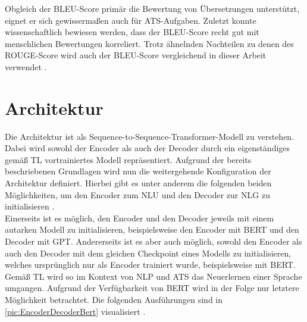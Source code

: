 \noindent
Obgleich der \ac{BLEU}-Score primär die Bewertung von Übersetzungen unterstützt, eignet er sich gewissermaßen auch für \ac{ATS}-Aufgaben. Zuletzt konnte wissenschaftlich bewiesen werden, dass der \ac{BLEU}-Score recht gut mit menschlichen Bewertungen korreliert. Trotz ähnelnden Nachteilen zu denen des \ac{ROUGE}-Score wird auch der \ac{BLEU}-Score vergleichend in dieser Arbeit verwendet \cite[S.~6-7]{PAP02}.


\section{Architektur}
\noindent
Die Architektur ist als Sequence-to-Sequence-Transformer-Modell zu verstehen. Dabei wird sowohl der Encoder als auch der Decoder durch ein eigenständiges gemäß \ac{TL} vortrainiertes Modell repräsentiert. Aufgrund der bereits beschriebenen Grundlagen wird nun die weitergehende Konfiguration der Architektur definiert. Hierbei gibt es unter anderem die folgenden beiden Möglichkeiten, um den Encoder zum \ac{NLU} und den Decoder zur \ac{NLG} zu initialisieren \cite[S.~2]{ROT20}.\\

\noindent
Einerseits ist es möglich, den Encoder und den Decoder jeweils mit einem autarken Modell zu initialisieren, beispielsweise den Encoder mit \ac{BERT} und den Decoder mit \ac{GPT}. Andererseits ist es aber auch möglich, sowohl den Encoder als auch den Decoder mit dem gleichen Checkpoint eines Modells zu initialisieren, welches ursprünglich nur als Encoder trainiert wurde, beispielsweise mit \ac{BERT}. Gemäß \ac{TL} wird so im Kontext von \ac{NLP} und \ac{ATS} das Neuerlernen einer Sprache umgangen. Aufgrund der Verfügbarkeit von \ac{BERT} wird in der Folge nur letztere Möglichkeit betrachtet. Die folgenden Ausführungen sind in \autoref{pic:EncoderDecoderBert} visualisiert \cite[S.~2-3]{ROT20}.
\newpage

